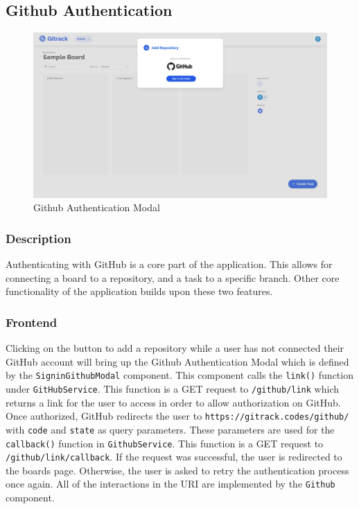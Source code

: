 \documentclass{article}
\def\code#1{\texttt{#1}}
\begin{document}
\subsection{Github Authentication}
\begin{figure}[H]
	\includegraphics[width=1\textwidth]{github-auth}\par\vspace{0.5cm}
	\caption{Github Authentication Modal}
	\label{fig:github-auth}
\end{figure}
\subsubsection{Description}
Authenticating with GitHub is a core part of the application. This allows for
connecting a board to a repository, and a task to a specific branch. Other core
functionality of the application builds upon these two features.

\subsubsection{Frontend}
Clicking on the button to add a repository while a user has not connected their
GitHub account will bring up the Github Authentication Modal which is defined by
the \code{SigninGithubModal} component. This component calls the \code{link()}
function under \code{GitHubService}. This function is a GET request to
\code{/github/link} which returns a link for the user to access in order to
allow authorization on GitHub. Once authorized, GitHub redirects the user to
\code{https://gitrack.codes/github/} with \code{code} and \code{state} as query
parameters. These parameters are used for the \code{callback()} function in
\code{GithubService}. This function is a GET request to
\code{/github/link/callback}. If the request was successful, the user is
redirected to the boards page. Otherwise, the user is asked to retry the
authentication process once again. All of the interactions in the URI are
implemented by the \code{Github} component.
\end{document}

